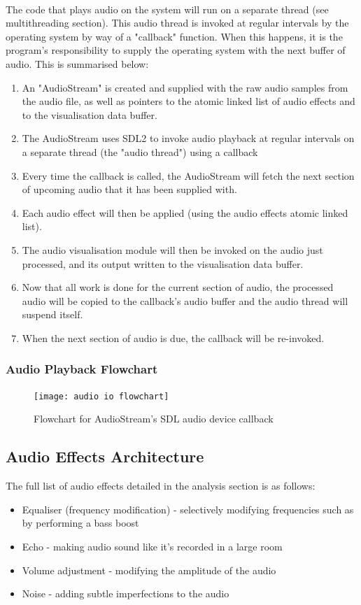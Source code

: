 \paragraph{}
The code that plays audio on the system will run on a separate thread (see multithreading section). This audio thread is invoked at regular intervals by the operating system by way of a "callback" function. When this happens, it is the program's responsibility to supply the operating system with the next buffer of audio. This is summarised below:

\begin{enumerate}
	\item An "AudioStream" is created and supplied with the raw audio samples from the audio file, as well as pointers to the atomic linked list of audio effects and to the visualisation data buffer.
	\item The AudioStream uses SDL2 to invoke audio playback at regular intervals on a separate thread (the "audio thread") using a callback
	\item Every time the callback is called, the AudioStream will fetch the next section of upcoming audio that it has been supplied with.
	\item Each audio effect will then be applied (using the audio effects atomic linked list).
	\item The audio visualisation module will then be invoked on the audio just processed, and its output written to the visualisation data buffer.
	\item Now that all work is done for the current section of audio, the processed audio will be copied to the callback's audio buffer and the audio thread will suspend itself.
	\item When the next section of audio is due, the callback will be re-invoked.
\end{enumerate}

\subsubsection { Audio Playback Flowchart }
\begin{figure}[H]
	\texttt{[image: audio io flowchart]}
	\caption{Flowchart for AudioStream's SDL audio device callback}
\end{figure}

\pagebreak

\subsection{Audio Effects Architecture}
The full list of audio effects detailed in the analysis section is as follows:
\begin{itemize}
	\item Equaliser (frequency modification) - selectively modifying frequencies such as by performing a bass boost
	\item Echo - making audio sound like it's recorded in a large room
	\item Volume adjustment - modifying the amplitude of the audio
	\item Noise - adding subtle imperfections to the audio
\end{itemize}

